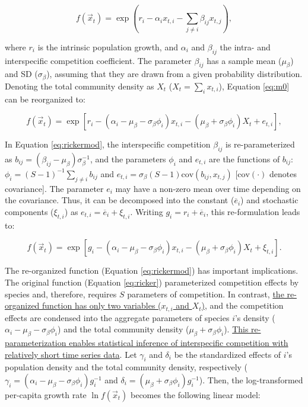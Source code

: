 \documentclass[12pt, class=article, crop=false]{standalone}
\begin{document}
\begin{equation}
\label{eq:ricker}
f(\overset{\rightarrow}{x}_{t}) = \exp(r_i - \alpha_i x_{t,i} - \sum_{j \ne i} \beta_{ij} x_{t,j}),
\end{equation}

where $r_i$ is the intrinsic population growth, and $\alpha_{i}$ and $\beta_{ij}$ the intra- and interspecific competition coefficient.
The parameter $\beta_{ij}$ has a sample mean ($\mu_{\beta}$) and SD ($\sigma_{\beta}$), assuming that they are drawn from a given probability distribution. 
Denoting the total community density as $X_t$ ($X_t = \sum_i x_{t,i}$), Equation \ref{eq:m0} can be reorganized to:

\begin{equation}
\label{eq:rickermod0}
f(\overset{\rightarrow}{x}_{t}) = \exp\left[r_i - (\alpha_i - \mu_{\beta} - \sigma_{\beta} \phi_i) x_{t,i} - (\mu_{\beta} +  \sigma_{\beta} \phi_i) X_t + e_{t,i} \right],
\end{equation}

In Equation \ref{eq:rickermod}, the interspecific competition $\beta_{ij}$ is re-parameterized as $b_{ij} = (\beta_{ij} - \mu_{\beta}) \sigma_{\beta}^{-1}$, and the parameters $\phi_{i}$ and $e_{t,i}$ are the functions of $b_{ij}$: $\phi_i = (S-1)^{-1}\sum_{j \ne i} b_{ij}$ and $e_{t,i} = \sigma_{\beta} (S - 1) \mbox{cov}(b_{ij}, x_{t,j})$ [$\mbox{cov}(\cdot)$ denotes covariance].
The parameter $e_i$ may have a non-zero mean over time depending on the covariance.
Thus, it can be decomposed into the constant ($\overline{e}_i$) and stochastic components ($\xi_{t,i}$) as $e_{t,i} = \overline{e}_i + \xi_{t,i}$.
Writing $g_{i} = r_i + \overline{e}_i$, this re-formulation leads to:

\begin{equation}
\label{eq:rickermod}
    f(\overset{\rightarrow}{x}_{t}) = \exp\left[g_{i} - (\alpha_i - \mu_{\beta} - \sigma_{\beta} \phi_i) x_{t,i} - (\mu_{\beta} +  \sigma_{\beta} \phi_i) X_t + \xi_{t,i} \right].
\end{equation}

The re-organized function (Equation \ref{eq:rickermod}) has important implications. 
The original function (Equation \ref{eq:ricker}) parameterized competition effects by species and, therefore, requires $S$ parameters of competition.
In contrast, \ul{the re-organized function has only two variables ($x_{t,i}$ and $X_t$)}, and the competition effects are condensed into the aggregate parameters of species $i$'s density ($\alpha_i - \mu_{\beta} - \sigma_{\beta} \phi_i$) and the total community density ($\mu_{\beta} + \sigma_{\beta} \phi_i$).
\ul{This re-parameterization enables statistical inference of interspecific competition with relatively short time series data}.
Let $\gamma_i$ and $\delta_i$ be the standardized effects of $i$'s population density and the total community density, respectively ($\gamma_i = (\alpha_i - \mu_{\beta} - \sigma_{\beta} \phi_i)g_i^{-1}$ and $\delta_i = (\mu_{\beta} + \sigma_{\beta} \phi_i)g_i^{-1}$).
Then, the log-transformed per-capita growth rate $\ln f(\overset{\rightarrow}{x}_{t})$ becomes the following linear model:
\end{document}
